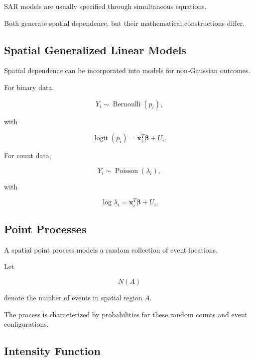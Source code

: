 SAR models are usually specified through simultaneous equations.

Both generate spatial dependence, but their mathematical constructions
differ.

\subsection{Spatial Generalized Linear Models}
\label{subsec:spatial-generalized-linear-models}

Spatial dependence can be incorporated into models for non-Gaussian
outcomes.

For binary data,

\[
\boxed{
Y_i
\sim
\operatorname{Bernoulli}(p_i),
}
\]

with

\[
\boxed{
\operatorname{logit}(p_i)
=
\mathbf{x}_i^T
\boldsymbol{\beta}
+
U_i.
}
\]

For count data,

\[
\boxed{
Y_i
\sim
\operatorname{Poisson}(\lambda_i),
}
\]

with

\[
\boxed{
\log\lambda_i
=
\mathbf{x}_i^T
\boldsymbol{\beta}
+
U_i.
}
\]

\subsection{Point Processes}
\label{subsec:point-processes}

A spatial point process models a random collection of event locations.

Let

\[
N(A)
\]

denote the number of events in spatial region \(A\).

The process is characterized by probabilities for these random counts and
event configurations.

\subsection{Intensity Function}
\label{subsec:spatial-intensity-function}

